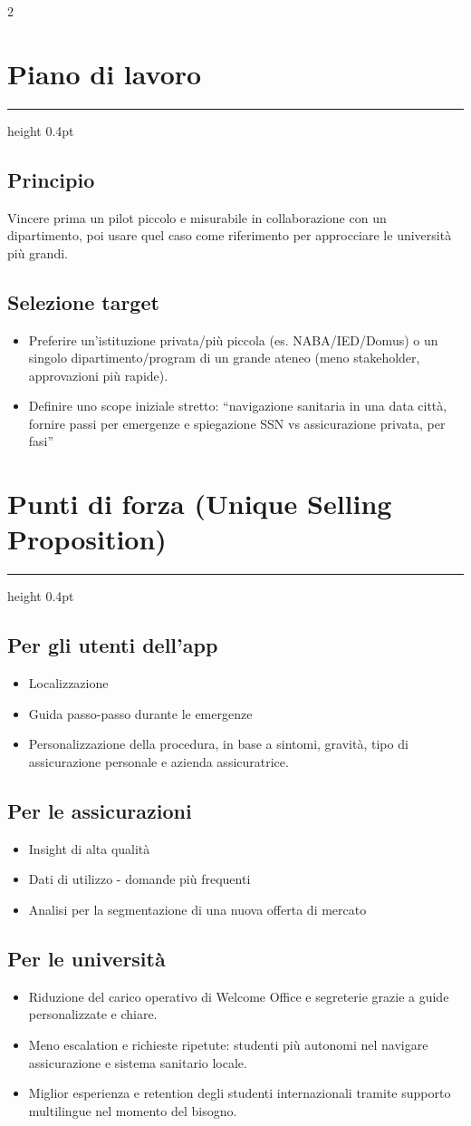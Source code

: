 \documentclass[10pt,a4paper]{scrartcl}
\newcommand{\PosterSection}[1]{%
  \section*{#1}%
  \vspace{0.4em}%
  {\color{accent!35}\hrule height 0.4pt}%
  \vspace{0.25em}%
}
\begin{document}
\begin{multicols*}{2}
\PosterSection{Piano di lavoro}
\subsection*{Principio}
Vincere prima un pilot piccolo e misurabile in collaborazione con un dipartimento, poi usare quel caso come riferimento per approcciare le università più grandi.

\subsection*{Selezione target}
\begin{itemize}
  \item Preferire un’istituzione privata/più piccola (es. NABA/IED/Domus) o un singolo dipartimento/program di un grande ateneo (meno stakeholder, approvazioni più rapide).
  \item Definire uno scope iniziale stretto: “navigazione sanitaria in una data città, fornire passi per emergenze e spiegazione SSN vs assicurazione privata, per fasi”
\end{itemize}

\PosterSection{Punti di forza (Unique Selling Proposition)}
\subsection*{Per gli utenti dell’app}
\begin{itemize}
  \item Localizzazione
  \item Guida passo-passo durante le emergenze
  \item Personalizzazione della procedura, in base a sintomi, gravità, tipo di assicurazione personale e azienda assicuratrice.
\end{itemize}
  
\subsection*{Per le assicurazioni}
\begin{itemize}
  \item Insight di alta qualità
  \item Dati di utilizzo - domande più frequenti
  \item Analisi per la segmentazione di una nuova offerta di mercato
\end{itemize}

\subsection*{Per le università}
\begin{itemize}
  \item Riduzione del carico operativo di Welcome Office e segreterie grazie a guide personalizzate e chiare.
  \item Meno escalation e richieste ripetute: studenti più autonomi nel navigare assicurazione e sistema sanitario locale.
  \item Miglior esperienza e retention degli studenti internazionali tramite supporto multilingue nel momento del bisogno.
\end{itemize}
  

\end{multicols*}
\end{document}
